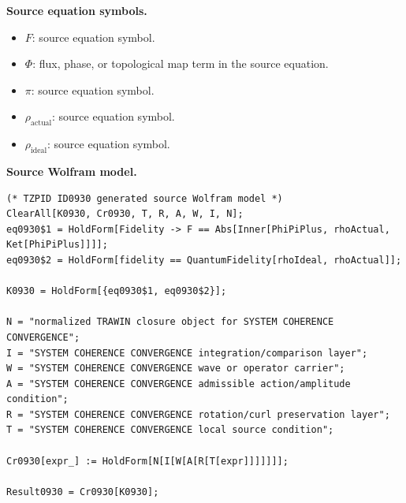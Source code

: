 \begin{minipage}[t]{0.49\linewidth}
\begingroup
\small
\raggedright
\textbf{Source equation symbols.}\par
\begin{itemize}[leftmargin=1.35em,itemsep=1pt,topsep=1pt,parsep=0pt]
    \item $F$: source equation symbol.
    \item $\Phi$: flux, phase, or topological map term in the source equation.
    \item $\pi$: source equation symbol.
    \item $\rho_{\mathrm{actual}}$: source equation symbol.
    \item $\rho_{\mathrm{ideal}}$: source equation symbol.
\end{itemize}
\endgroup
\end{minipage}\hfill
\begin{minipage}[t]{0.47\linewidth}
\begingroup
\scriptsize
\raggedright
\textbf{Source Wolfram model.}\par
\begin{Verbatim}[fontsize=\tiny,breaklines=true,breakanywhere=true]
(* TZPID ID0930 generated source Wolfram model *)
ClearAll[K0930, Cr0930, T, R, A, W, I, N];
eq0930$1 = HoldForm[Fidelity -> F == Abs[Inner[PhiPiPlus, rhoActual, Ket[PhiPiPlus]]]];
eq0930$2 = HoldForm[fidelity == QuantumFidelity[rhoIdeal, rhoActual]];

K0930 = HoldForm[{eq0930$1, eq0930$2}];

N = "normalized TRAWIN closure object for SYSTEM COHERENCE CONVERGENCE";
I = "SYSTEM COHERENCE CONVERGENCE integration/comparison layer";
W = "SYSTEM COHERENCE CONVERGENCE wave or operator carrier";
A = "SYSTEM COHERENCE CONVERGENCE admissible action/amplitude condition";
R = "SYSTEM COHERENCE CONVERGENCE rotation/curl preservation layer";
T = "SYSTEM COHERENCE CONVERGENCE local source condition";

Cr0930[expr_] := HoldForm[N[I[W[A[R[T[expr]]]]]]];

Result0930 = Cr0930[K0930];
\end{Verbatim}
\endgroup
\end{minipage}

